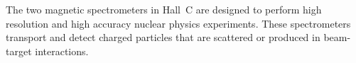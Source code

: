 


	The two magnetic spectrometers in Hall~C are designed to perform
high resolution and high accuracy nuclear physics experiments.  These
spectrometers transport and detect charged particles that are scattered or produced
in beam-target interactions.
